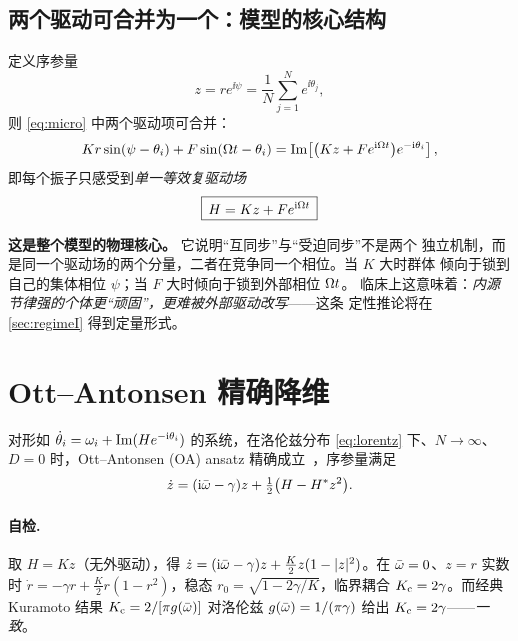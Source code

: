\subsection{两个驱动可合并为一个：模型的核心结构}

定义序参量
%
\begin{equation}\label{eq:orderparam}
z=r e^{\ii\psi}=\frac{1}{N}\sum_{j=1}^{N}e^{\ii\theta_j} ,
\end{equation}
%
则 \cref{eq:micro} 中两个驱动项可合并：
%
\begin{equation*}
Kr\sin(\psi-\theta_i)+F\sin(\Omega t-\theta_i)
=\operatorname{Im}\!\left[\bigl(Kz+Fe^{\mathrm{i}\Omega t}\bigr)e^{-\mathrm{i}\theta_i}\right],
\end{equation*}
%
即每个振子只感受到\emph{单一等效复驱动场}
%
\begin{equation}\label{eq:Hfield}
\boxed{\,H=Kz+Fe^{\mathrm{i}\Omega t}\,}
\end{equation}

\noindent\textbf{这是整个模型的物理核心。} 它说明“互同步”与“受迫同步”不是两个
独立机制，而是同一个驱动场的两个分量，二者在竞争同一个相位。当 $K$ 大时群体
倾向于锁到自己的集体相位 $\psi$；当 $F$ 大时倾向于锁到外部相位 $\Omega t$。
临床上这意味着：\emph{内源节律强的个体更“顽固”，更难被外部驱动改写}——这条
定性推论将在 \cref{sec:regimeI} 得到定量形式。

\section{Ott--Antonsen 精确降维}
\label{sec:OA}

对形如 $\dot\theta_i=\omega_i+\operatorname{Im}(He^{-\mathrm{i}\theta_i})$ 的系统，在洛伦兹分布
\cref{eq:lorentz} 下、$N\to\infty$、$D=0$ 时，Ott--Antonsen (OA)
ansatz 精确成立~\citep{Ott2008}，序参量满足
%
\begin{equation}\label{eq:oa}
\dot z=(\mathrm{i}\bar{\omega}-\gamma)z+\tfrac12\bigl(H-H^{*}z^{2}\bigr).
\end{equation}

\paragraph{自检.}
取 $H=Kz$（无外驱动），得
$\dot z=(\mathrm{i}\bar{\omega}-\gamma)z+\frac{K}{2}z(1-|z|^2)$。在 $\bar{\omega}=0$、$z=r$ 实数时
$\dot r=-\gamma r+\frac{K}{2}r(1-r^2)$，稳态 $r_0=\sqrt{1-2\gamma/K}$，临界耦合
$K_{\mathrm{c}}=2\gamma$。而经典 Kuramoto 结果 $K_{\mathrm{c}}=2/[\pi g(\bar{\omega})]$ 对洛伦兹
$g(\bar{\omega})=1/(\pi\gamma)$ 给出 $K_{\mathrm{c}}=2\gamma$——\emph{一致}。

